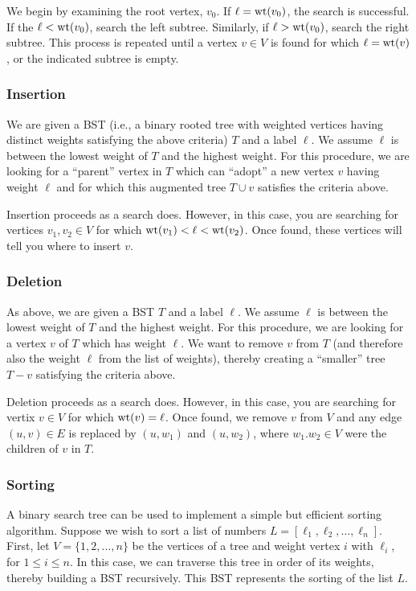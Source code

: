 We begin by examining the root vertex, $v_0$. If $\ell={\rm wt}(v_0)$,
the search is successful. If the $\ell<{\rm wt}(v_0)$,
search the left subtree. Similarly, if $\ell>{\rm wt}(v_0)$,
search the right subtree. This process is repeated until a vertex
$v\in V$ is found for which $\ell={\rm wt}(v)$,
or the indicated subtree is empty.


\subsubsection{Insertion}

We are given a BST (i.e., a binary rooted tree with weighted vertices
having distinct weights satisfying the above criteria) $T$ and a
label $\ell$. We assume $\ell$ is between the
lowest weight of $T$ and the highest weight.
For this procedure, we are looking for a ``parent''
vertex in $T$ which can ``adopt'' a new vertex $v$ having weight $\ell$
and for which this augmented tree $T\cup v$ satisfies
the criteria above.

Insertion proceeds as a search does. However, in this case, you are
searching for vertices $v_1,v_2\in V$ for which
${\rm wt}(v_1)<\ell < {\rm wt}(v_2)$. Once found, these
vertices will tell you where to insert $v$.

\subsubsection{Deletion}

As above, we are given a BST $T$ and a
label $\ell$. We assume $\ell$ is between the
lowest weight of $T$ and the highest weight.
For this procedure, we are looking for a vertex $v$ of
$T$ which has weight $\ell$. We want to remove $v$ from
$T$ (and therefore also the weight $\ell$ from the list of weights),
thereby creating a ``smaller'' tree $T- v$ satisfying
the criteria above.

Deletion proceeds as a search does. However, in this case, you are
searching for vertix $v\in V$ for which
${\rm wt}(v)=\ell$. Once found, we remove $v$ from $V$
and any edge $(u,v)\in E$ is replaced by $(u,w_1)$
and $(u,w_2)$, where $w_1.w_2\in V$ were the children of $v$
in $T$.

\subsubsection{Sorting}

A binary search tree can be used to implement a simple but efficient
sorting algorithm. Suppose we wish to sort a list of numbers
$L = [\ell_1, \ell_2,\dots, \ell_n]$. First, let $V=\{1,2,\dots,n\}$
be the vertices of a tree and weight vertex $i$ with $\ell_i$,
for $1\leq i\leq n$. In this case, we can traverse this tree
in order of its weights, thereby building a BST recursively.
This BST represents the sorting of the list $L$.


